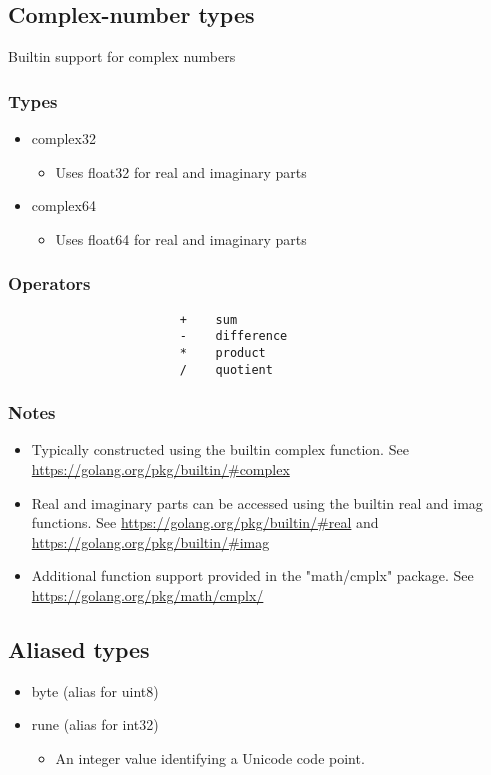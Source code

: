 \documentclass{article}
\begin{document}
				
    		\subsection{Complex-number types}
			Builtin support for complex numbers
			\subsubsection{Types}
			\begin{itemize}
    				\item complex32
					\begin{itemize}
						\item Uses float32 for real and imaginary parts
					\end{itemize}
    				\item complex64
					\begin{itemize}
						\item Uses float64 for real and imaginary parts
					\end{itemize}
			\end{itemize}
			\subsubsection{Operators}
				\begin{verbatim}
					    +    sum  
					    -    difference   
					    *    product       
					    /    quotient     
				\end{verbatim}	
			\subsubsection{Notes}
				\begin{itemize}
					\item Typically constructed using the builtin \colorbox{code}{complex} function. See \url{https://golang.org/pkg/builtin/#complex}
					\item Real and imaginary parts can be accessed using the builtin \colorbox{code}{real} and \colorbox{code}{imag} functions. See \url{https://golang.org/pkg/builtin/#real} and \url{https://golang.org/pkg/builtin/#imag}
					\item Additional function support provided in the "math/cmplx" package. See \url{https://golang.org/pkg/math/cmplx/}
				\end{itemize}
			
			
    		\subsection{Aliased types}
			\begin{itemize}
    				\item byte (alias for uint8)		
    				\item rune (alias for int32)
				\begin{itemize}
					\item An integer value identifying a Unicode code point.
				\end{itemize}
			\end{itemize}
	
\end{document}
